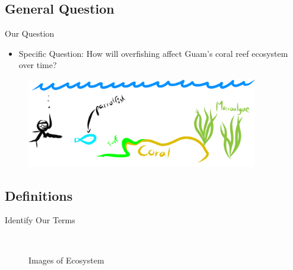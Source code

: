 \documentclass{beamer}
\begin{document}
\subsection{General Question}
\begin{frame}{Our Question}
\begin{itemize}
    \item Specific Question: How will overfishing affect Guam's coral reef ecosystem over time?
\end{itemize}
\quad
\begin{figure}
    \centering
    \includegraphics[width=0.9\textwidth]{Latex/Figures/figure1.png}
\end{figure}
\end{frame}

\subsection{Definitions}
\begin{frame}{Identify Our Terms}
\vspace{-0.2cm}
    \begin{figure}%
        \centering
        \\
        \qquad
        \caption{Images of Ecosystem}%
        \label{fig:graphs}%
    \end{figure}
\end{frame}
\end{document}
